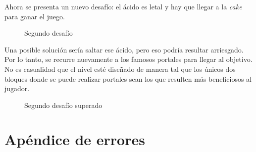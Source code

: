\documentclass[a4paper]{article}
\begin{document}
Ahora se presenta un nuevo desafío: el ácido es letal y hay que llegar a la \textit{cake} para ganar el juego.

\begin{figure}[!h]
	\caption{Segundo desafío}
	\label{fig:diagrama6}
\end{figure}

Una posible solución sería saltar ese ácido, pero eso podría resultar arriesgado. Por lo tanto, se recurre nuevamente a los famosos portales para llegar al objetivo. No es casualidad que el nivel esté diseñado de manera tal que los únicos dos bloques donde se puede realizar portales sean los que resulten más beneficiosos al jugador.

\begin{figure}[!h]
	\caption{Segundo desafío superado}
	\label{fig:diagrama7}
\end{figure}




\section{Apéndice de errores}
\end{document}
